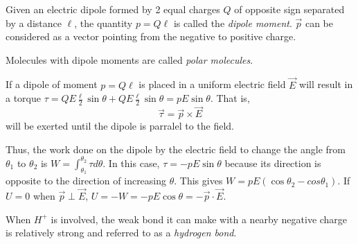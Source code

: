 \begin{definition}
    Given an electric dipole formed by 2 equal charges $Q$ of opposite sign separated by a distance $\ell$, the quantity $p = Q\ell$ is called the \emph{dipole moment}. $\vec{p}$ can be considered as a vector pointing from the negative to positive charge.
\end{definition}
\begin{definition}
    Molecules with dipole moments are called \emph{polar molecules}.
\end{definition}
\begin{remark}
    If a dipole of moment $p = Q\ell$ is placed in a uniform electric field $\vec{E}$ will result in a torque $\tau = QE\frac{\ell}{2}\sin\theta + QE\frac{\ell}{2}\sin\theta = pE\sin\theta$. That is, $$\vec{\tau} = \vec{p} \times \vec{E}$$ will be exerted until the dipole is parralel to the field.

    Thus, the work done on the dipole by the electric field to change the angle from $\theta_1$ to $\theta_2$ is $W = \int_{\theta_1}^{\theta_2}\tau d\theta$. In this case, $\tau = -pE\sin\theta$ because its direction is opposite to the direction of increasing $\theta$. This gives $W = pE(\cos\theta_2 - cos\theta_1).$ If $U = 0$ when $\vec{p} \perp \vec{E}$, $U = -W = -pE\cos\theta = -\vec{p}\cdot\vec{E}.$
\end{remark}
\begin{definition}
    When $H^+$ is involved, the weak bond it can make with a nearby negative charge is relatively strong and referred to as a \emph{hydrogen bond}.
\end{definition}